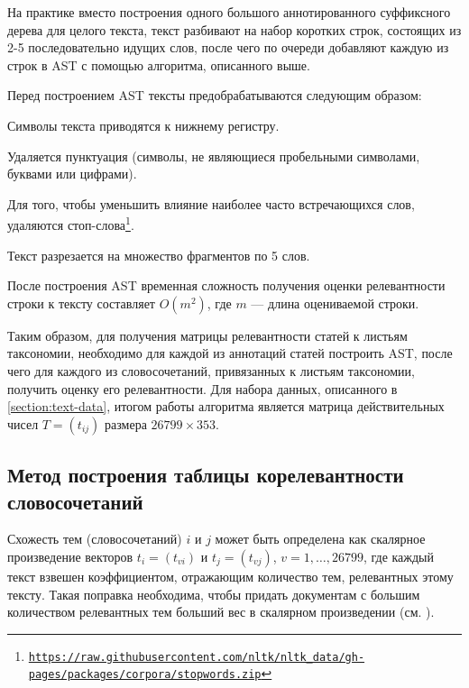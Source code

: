 \documentclass[12pt]{article}
\newenvironment{enumerate*}%
{\begin{enumerate}%
		\setlength{\itemsep}{0pt}%
		\setlength{\parskip}{0pt}}%
	{\end{enumerate}}
\newcommand{\hrefl}[1] {\texttt{\href{#1}{#1}}}
\begin{document}
На практике вместо построения одного большого аннотированного суффиксного дерева для целого текста, текст разбивают на набор коротких строк, состоящих из 2-5 последовательно идущих слов, после чего по очереди добавляют каждую из строк в AST с помощью алгоритма, описанного выше.

Перед построением AST тексты предобрабатываются следующим образом:
\begin{enumerate*}
	\item Символы текста приводятся к нижнему регистру.
	\item Удаляется пунктуация (символы, не являющиеся пробельными символами, буквами или цифрами).
	\item Для того, чтобы уменьшить влияние наиболее часто встречающихся слов, удаляются стоп-слова\footnote{\hrefl{https://raw.githubusercontent.com/nltk/nltk\_data/gh-pages/packages/corpora/stopwords.zip}}.
	\item Текст разрезается на множество фрагментов по 5 слов.
\end{enumerate*}

После построения AST временная сложность получения оценки релевантности строки к тексту составляет $O(m^2)$, где $m$ --- длина оцениваемой строки.

Таким образом, для получения матрицы релевантности статей к листьям таксономии, необходимо для каждой из аннотаций статей построить AST, после чего для каждого из словосочетаний, привязанных к листьям таксономии, получить оценку его релевантности. Для набора данных, описанного в \ref{section:text-data}, итогом работы алгоритма является матрица действительных чисел $T=(t_{ij})$ размера $26799 \times 353$.


\subsection{Метод построения таблицы корелевантности словосочетаний}

Схожесть тем (словосочетаний) $i$ и $j$ может быть определена как скалярное произведение векторов $t_i=(t_{vi})$ и $t_j=(t_{vj})$, $v=1,\ldots,26799$, где каждый текст взвешен коэффициентом, отражающим количество тем, релевантных этому тексту. Такая поправка необходима, чтобы придать документам с большим количеством релевантных тем больший вес в скалярном произведении (см. \cite{mirkin2010constructing}).
\end{document}
